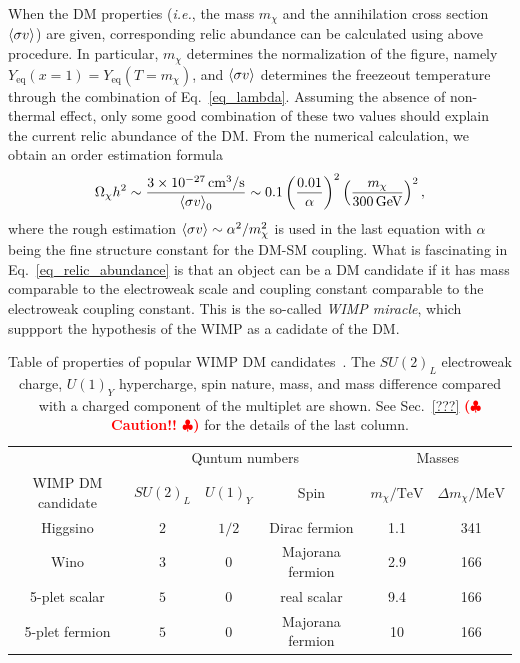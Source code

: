 \documentclass[12pt,twoside,book]{article}
\def\rem#1{ {\bf\textcolor{red}{($\clubsuit$ #1 $\clubsuit$)}}}
\begin{document}
When the DM properties (\textit{i.e.}, the mass $m_\chi$ and the
annihilation cross section $\Braket{\sigma v}$) are given,
corresponding relic abundance can be calculated using above procedure.
In particular, $m_\chi$ determines the normalization of the figure,
namely $Y_{\mathrm{eq}} (x=1) = Y_{\mathrm{eq}} (T=m_\chi)$, and
$\Braket{\sigma v}$ determines the freezeout temperature through the
combination of Eq.~\eqref{eq_lambda}.  Assuming the absence of
non-thermal effect, only some good combination of these two values
should explain the current relic abundance of the DM.  From the
numerical calculation, we obtain an order estimation formula
\begin{align}
 \Omega_\chi h^2 \sim \frac{3 \times 10^{-27}\,\mathrm{cm^3}/\mathrm{s}}
 {\Braket{\sigma v}_0} \sim
 0.1 \left( \frac{0.01}{\alpha} \right)^2
 \left( \frac{m_\chi}{300\,\mathrm{GeV}} \right)^2,\label{eq_relic_abundance}
\end{align}
where the rough estimation $\Braket{\sigma v} \sim \alpha^2/m_\chi^2$ is
used in the last equation with $\alpha$ being the fine structure
constant for the DM-SM coupling.  What is fascinating in
Eq.~\eqref{eq_relic_abundance} is that an object can be a DM candidate
if it has mass comparable to the electroweak scale and coupling constant
comparable to the electroweak coupling constant.  This is the so-called
\textit{WIMP miracle}, which suppport the hypothesis of the WIMP as a
cadidate of the DM.

\begin{table}
 \centering 
 \begin{tabular}{c|ccc|cc}
  & \multicolumn{3}{c|}{Quntum numbers} & \multicolumn{2}{c}{Masses}\\
  WIMP DM candidate & $SU(2)_L$ & $U(1)_Y$ & Spin & $m_\chi / \mathrm{TeV}$ &
  $\Delta m_\chi / \mathrm{MeV}$ \\
  \hline
  Higgsino & $2$ & $1/2$ & Dirac fermion & 1.1 & 341 \\
  Wino & $3$ & $0$ & Majorana fermion & 2.9 & 166 \\
  5-plet scalar & $5$ & $0$ & real scalar & 9.4 & 166 \\
  5-plet fermion & $5$ & $0$ & Majorana fermion & 10 & 166
 \end{tabular}
 \caption{Table of properties of popular WIMP DM
 candidates~\cite{Farina:2013mla, ArkaniHamed:2006mb, Hisano:2006nn,
 Cirelli:2007xd, Moroi:2013sla, Beneke:2016ync}.  The $SU(2)_L$
 electroweak charge, $U(1)_Y$ hypercharge, spin nature, mass, and mass
 difference compared with a charged component of the multiplet are
 shown.  See Sec.~\ref{???}  \rem{Caution!!} for the details of the last
 column.}  \label{tab_WIMP_property}
\end{table}
\end{document}
